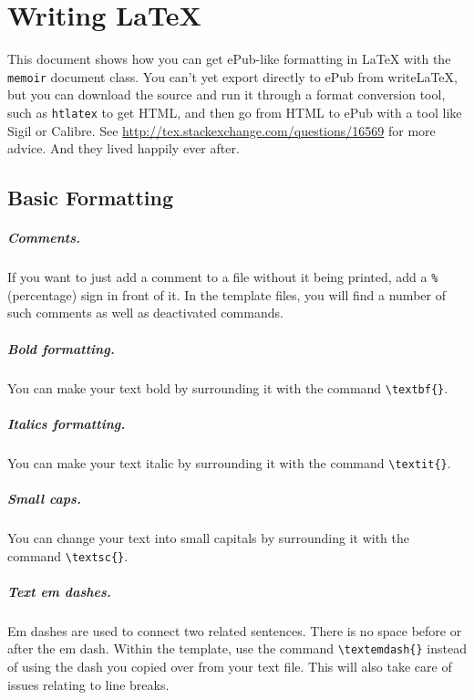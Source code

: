 \chapter{Writing \LaTeX{}}\label{cha:c1_firstchapter}

This document shows how you can get ePub-like formatting in \LaTeX{} with the \verb|memoir| document class. You can't yet export directly to ePub from writeLaTeX, but you can download the source and run it through a format conversion tool, such as \verb|htlatex| to get HTML, and then go from HTML to ePub with a tool like Sigil or Calibre. See \url{http://tex.stackexchange.com/questions/16569} for more advice. And they lived happily ever after.

\section{Basic Formatting}\label{sec:c1_basicformatting}

\paragraph{Comments.} If you want to just add a comment to a file without it
being printed, add a \lstinline[language=Tex]!%! (percentage) sign in front of
it. In the template files, you will find a number of such
comments as well as deactivated commands.

\paragraph{Bold formatting.} You can make your text bold by surrounding it
with the command \lstinline[language=Tex]!\textbf{}!.

\paragraph{Italics formatting.} You can make your text italic by surrounding
it with the command \lstinline[language=Tex]!\textit{}!.

\paragraph{Small caps.} You can change your text into small capitals by
surrounding it with the command \lstinline[language=Tex]!\textsc{}!.
    
\paragraph{Text em dashes.} Em dashes are used to connect two related sentences.
There is no space before or after the em dash. Within the template, use the
command \lstinline[language=Tex]!\textemdash{}! instead of using the dash you
copied over from your text file. This will also take care of issues relating to
line breaks.

